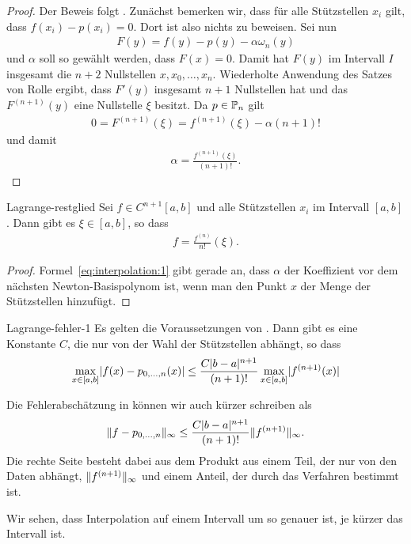 \begin{proof}
  Der Beweis folgt \cite[Satz 2.1.4.1]{Stoer83}.  Zunächst bemerken
  wir, dass für alle Stützstellen $x_i$ gilt, dass
  $f(x_i) - p(x_i) = 0$. Dort ist also nichts zu beweisen.
  Sei nun
  \begin{gather}
    \label{eq:interpolation:1}
    F(y) = f(y)-p(y) - \alpha \omega_n(y)
  \end{gather}
  und $\alpha$ soll so gewählt werden, dass $F(x) = 0$. Damit hat $F(y)$ im
  Intervall $I$ insgesamt die $n+2$ Nullstellen $x,x_0,\dots,x_n$.
  Wiederholte Anwendung des Satzes von Rolle ergibt, dass $F'(y)$
  insgesamt $n+1$ Nullstellen hat und das $F^{(n+1)}(y)$ eine
  Nullstelle $\xi$ besitzt. Da $p\in \P_n$ gilt
  \begin{gather}
    0 = F^{(n+1)}(\xi) = f^{(n+1)}(\xi) - \alpha (n+1)!
  \end{gather}
  und damit
  \begin{gather}
    \alpha = \frac{f^{(n+1)}(\xi)}{(n+1)!}.
  \end{gather}
\end{proof}

\begin{Korollar}{Lagrange-restglied}
  Sei $f \in C^{n+1}[a,b]$ und alle Stützstellen $x_i$ im Intervall
  $[a,b]$. Dann gibt es $\xi\in[a,b]$, so dass
  \begin{gather}
    [x_0,\dots,x_n]f = \frac{f^{(n)}}{n!}(\xi).
  \end{gather}
\end{Korollar}

\begin{proof}
  Formel~\eqref{eq:interpolation:1} gibt gerade an, dass $\alpha$ der
  Koeffizient vor dem nächsten Newton-Basispolynom ist, wenn man den
  Punkt $x$ der Menge der Stützstellen hinzufügt.
\end{proof}

\begin{Korollar}{Lagrange-fehler-1}
  Es gelten die Voraussetzungen von
  . Dann gibt es eine Konstante
  $C$, die nur von der Wahl der Stützstellen abhängt, so dass
  \begin{gather}
    \max_{x\in[a,b]} \abs{f(x)-p_{0,\dots,n}(x)}
    \le \frac{C \abs{b-a}^{n+1}}{(n+1)!} \max_{x\in[a,b]} \abs{f^{(n+1)}(x)} 
  \end{gather}
\end{Korollar}

\begin{remark}
  Die Fehlerabschätzung in 
  können wir auch kürzer schreiben als
  \begin{gather}
    \norm{f-p_{0,\dots,n}}_\infty \le \frac{C \abs{b-a}^{n+1}}{(n+1)!}
    \norm{f^{(n+1)}}_{\infty}.
  \end{gather}
  Die rechte Seite besteht dabei aus dem Produkt aus einem Teil, der
  nur von den Daten abhängt, $\norm{f^{(n+1)}}_{\infty}$ und einem
  Anteil, der durch das Verfahren bestimmt ist.

  Wir sehen, dass Interpolation auf einem Intervall um so genauer ist,
  je kürzer das Intervall ist.
\end{remark}

